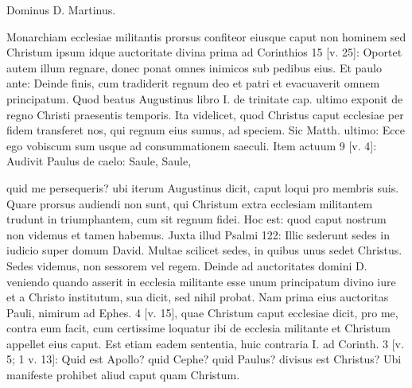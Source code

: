 Dominus D. Martinus.

Monarchiam ecclesiae militantis prorsus confiteor eiusque caput non hominem sed Christum ipsum idque auctoritate divina prima ad Corinthios 15 [v. 25]: Oportet autem illum regnare, donec ponat omnes inimicos sub pedibus eius. Et paulo ante: Deinde finis, cum tradiderit regnum deo et patri et evacuaverit omnem principatum. Quod beatus Augustinus libro I. de trinitate cap. ultimo exponit de regno Christi praesentis temporis. Ita videlicet, quod Christus caput ecclesiae per fidem transferet nos, qui regnum eius sumus, ad speciem. Sic Matth. ultimo: Ecce ego vobiscum sum usque ad consummationem saeculi. Item actuum 9 [v. 4]: Audivit Paulus de caelo: Saule, Saule,

quid me persequeris? ubi iterum Augustinus dicit, caput loqui pro membris suis. Quare prorsus audiendi non sunt, qui Christum extra ecclesiam militantem trudunt in triumphantem, cum sit regnum fidei. Hoc est: quod caput nostrum non videmus et tamen habemus. Juxta illud Psalmi 122: Illic sederunt sedes in iudicio super domum David. Multae scilicet sedes, in quibus unus sedet Christus. Sedes videmus, non sessorem vel regem. Deinde ad auctoritates domini D. veniendo quando asserit in ecclesia militante esse unum principatum divino iure et a Christo institutum, sua dicit, sed nihil probat. Nam prima eius auctoritas Pauli, nimirum ad Ephes. 4 [v. 15], quae Christum caput ecclesiae dicit, pro me, contra eum facit, cum certissime loquatur ibi de ecclesia militante et Christum appellet eius caput. Est etiam eadem sententia, huic contraria I. ad Corinth. 3 [v. 5; 1 v. 13]: Quid est Apollo? quid Cephe? quid Paulus? divisus est Christus? Ubi manifeste prohibet aliud caput quam Christum.

